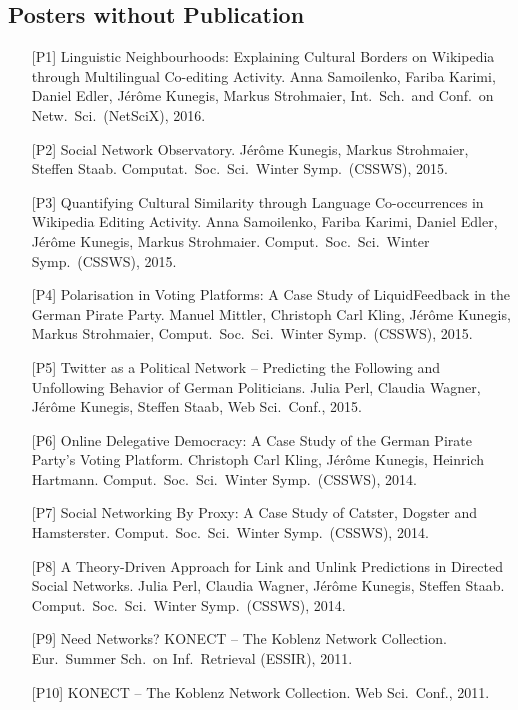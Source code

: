 \documentclass[line,margin]{res}
\newcounter{x}
\begin{document}
\begin{resume}
\section{Posters without Publication}
\begin{itemize}
  \item[{[P1]}] Linguistic Neighbourhoods:  Explaining Cultural Borders on
    Wikipedia through Multilingual Co-editing Activity.  Anna
    Samoilenko, Fariba Karimi, Daniel Edler, Jérôme Kunegis, Markus
    Strohmaier, Int.\ Sch.\ and Conf.\ on Netw.\ Sci.\ (NetSciX),
    2016. 
  \item[{[P2]}]
    Social Network Observatory.  Jérôme Kunegis, Markus Strohmaier,
    Steffen Staab.  Computat.\ Soc.\ Sci.\ Winter Symp.\ (CSSWS), 2015.
  \item[{[P3]}] 
    Quantifying Cultural Similarity through Language Co-occurrences
    in Wikipedia Editing Activity. Anna Samoilenko, Fariba Karimi,
    Daniel Edler, Jérôme Kunegis, Markus Strohmaier.  Comput.\ Soc.\ Sci.\ Winter Symp.\ (CSSWS), 2015.
  \item[{[P4]}] 
    Polarisation in Voting Platforms: A Case Study of LiquidFeedback
    in the German Pirate Party. Manuel Mittler, Christoph Carl Kling,
    Jérôme Kunegis, Markus Strohmaier, Comput.\ Soc.\ Sci.\ Winter Symp.\ (CSSWS), 2015.
  \item[{[P5]}]
    Twitter as a Political Network -- Predicting the Following and
    Unfollowing Behavior of {German} Politicians. Julia Perl, Claudia
    Wagner, Jérôme Kunegis, Steffen Staab, Web Sci.\ Conf., 2015. 
  \item[{[P6]}] 
    Online Delegative Democracy: A Case Study of the German Pirate
    Party's Voting Platform.  Christoph Carl Kling, Jérôme Kunegis,
    Heinrich Hartmann.  Comput.\ Soc.\ Sci.\ Winter
    Symp.\ (CSSWS), 2014.
  \item[{[P7]}]
    Social Networking By Proxy: A Case Study of Catster, Dogster and
    Hamsterster. Comput.\ Soc.\ Sci.\ Winter
    Symp.\ (CSSWS), 2014.
  \item[{[P8]}] 
    A Theory-Driven Approach for Link and Unlink Predictions in
    Directed Social Networks. Julia Perl, Claudia Wagner, Jérôme
    Kunegis, Steffen Staab.  Comput.\ Soc.\ Sci.\ Winter
    Symp.\ (CSSWS), 2014.
  \item[{[P9]}]
    Need Networks? KONECT -- The Koblenz Network Collection.
    Eur.\ Summer Sch.\ on Inf.\ Retrieval (ESSIR), 2011. 
  \item[{[P10]}]
    KONECT -- The Koblenz Network Collection. Web Sci.\ Conf., 2011. 

\end{itemize}
\end{resume}
\end{document}
